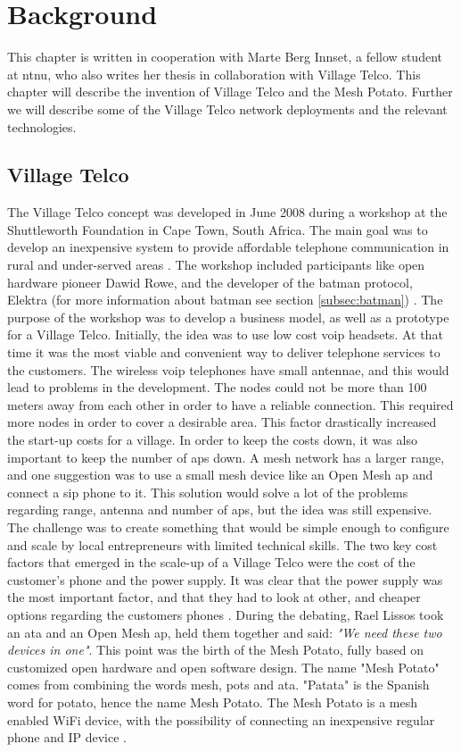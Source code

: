 \chapter{Background}
\label{chp:background} 

This chapter is written in cooperation with Marte Berg Innset, a fellow student at \gls{ntnu}, who also writes her thesis in collaboration with Village Telco. This chapter will describe the invention of Village Telco and the Mesh Potato. Further we will describe some of the Village Telco network deployments and the relevant technologies. 

\section{Village Telco}
The Village Telco concept was developed in June 2008 during a workshop at the Shuttleworth Foundation in Cape Town, South Africa. The main goal was to develop an inexpensive system to provide affordable telephone communication in rural and under-served areas \cite{MParticle}. The workshop included participants like open hardware pioneer Dawid Rowe, and the developer of the \gls{batman} protocol, Elektra (for more information about \gls{batman} see section \ref{subsec:batman}) \cite{MPworkshop}. The purpose of the workshop was to develop a business model, as well as a prototype for a Village Telco. Initially, the idea was to use low cost \gls{voip} headsets. At that time it was the most viable and convenient way to deliver telephone services to the customers. The wireless \gls{voip} telephones have small antennae, and this would lead to problems in the development. The nodes could not be more than 100 meters away from each other in order to have a reliable connection. This required more nodes in order to cover a desirable area. This factor drastically increased the start-up costs for a village. In order to keep the costs down, it was also important to keep the number of \glspl{ap} down. A mesh network has a larger range, and one suggestion was to use a small mesh device like an Open Mesh \gls{ap} and connect a \gls{sip} phone to it. This solution would solve a lot of the problems regarding range, antenna and number of \glspl{ap}, but the idea was still expensive. The challenge was to create something that would be simple enough to configure and scale by local entrepreneurs with limited technical skills. The two key cost factors that emerged in the scale-up of a Village Telco were the cost of the customer's phone and the power supply. It was clear that the power supply was the most important factor, and that they had to look at other, and cheaper options regarding the customers phones \cite{MPworkshop}. During the debating, Rael Lissos took an \gls{ata} and an Open Mesh \gls{ap}, held them together and said: \textit{"We need these two devices in one"}. This point was the birth of the Mesh Potato, fully based on customized open hardware and open software design. The name "Mesh Potato" comes from combining the words mesh, \gls{pots} and \gls{ata}. "Patata" is the Spanish word for potato, hence the name Mesh Potato. The Mesh Potato is a mesh enabled WiFi device, with the possibility of connecting an inexpensive regular phone and IP device \cite{MPorigin}.


